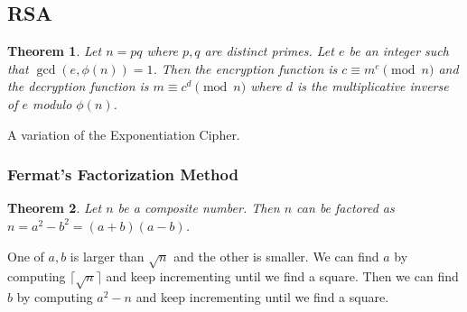 \documentclass[letterpaper,12pt,oneside]{article}
\newtheorem{theorem}{Theorem}
\begin{document}
\subsection{RSA}
\begin{theorem}
    Let $n=pq$ where $p,q$ are distinct primes. Let $e$ be an integer such that $\gcd(e,\phi(n)) = 1$. Then the encryption function is $c\equiv m^e\pmod{n}$ and the decryption function is $m\equiv c^d\pmod{n}$ where $d$ is the multiplicative inverse of $e$ modulo $\phi(n)$.
\end{theorem}
A variation of the Exponentiation Cipher.
\subsubsection{Fermat's Factorization Method}
\begin{theorem}
    Let $n$ be a composite number. Then $n$ can be factored as $n = a^2-b^2 = (a+b)(a-b)$.
\end{theorem}
One of $a,b$ is larger than $\sqrt{n}$ and the other is smaller. We can find $a$ by computing $\lceil \sqrt{n}\rceil$ and keep incrementing until we find a square. Then we can find $b$ by computing $a^2-n$ and keep incrementing until we find a square.
\end{document}
